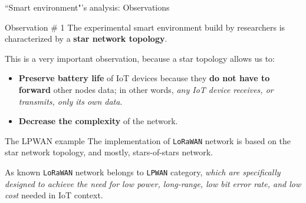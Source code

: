 \documentclass[10pt]{beamer}
\begin{document}
\begin{frame}{``Smart environment"'s analysis: Observations}

\begin{alertblock}{Observation \# 1}
The experimental smart environment build by researchers is characterized by a \textbf{star network topology}.
\end{alertblock}

This is a very important observation, because a star topology allows us to:

\begin{itemize}
\justifying
\item \textbf{Preserve battery life} of IoT devices because they \textbf{do not have to forward} other nodes data; in other words, \textit{any IoT device receives, or transmits, only its own data}.

\item \textbf{Decrease the complexity} of the network.
\end{itemize}

\begin{block}{The LPWAN example}
\justifying
The implementation of \texttt{LoRaWAN} network is based on the star network topology, and mostly, stars-of-stars network. 

As known \texttt{LoRaWAN} network belongs to \texttt{LPWAN} category, \textit{which are specifically designed to achieve the need for low power, long-range, low bit error rate, and low cost} needed in IoT context. 
\end{block}

\end{frame} 
\end{document}
